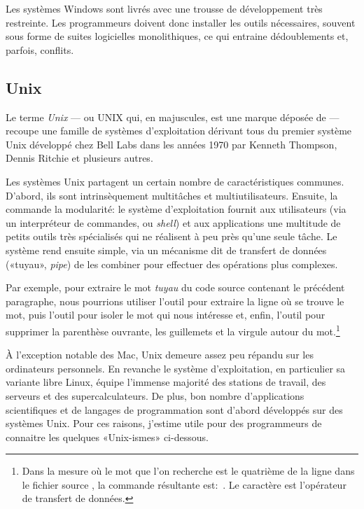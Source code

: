 Les systèmes Windows sont livrés avec une trousse de développement
très restreinte. Les programmeurs doivent donc installer les outils
nécessaires, souvent sous forme de suites logicielles monolithiques,
ce qui entraine dédoublements et, parfois, conflits.

\subsection{Unix}
\label{sec:informatique:os:unix}

Le terme \emph{Unix} --- ou UNIX qui, en majuscules, est
une marque déposée de 
--- recoupe une famille de systèmes d'exploitation dérivant tous du
premier système Unix développé chez Bell Labs dans les années 1970 par
Kenneth Thompson, Dennis Ritchie et plusieurs autres.

Les systèmes Unix partagent un certain nombre de caractéristiques
communes. D'abord, ils sont intrinsèquement multitâches et
multiutilisateurs. Ensuite, la
 commande la modularité: le système d'exploitation fournit aux
utilisateurs (via un interpréteur de commandes, ou \emph{shell}) et
aux applications une multitude de petits outils très spécialisés qui
ne réalisent à peu près qu'une seule tâche. Le système rend ensuite
simple, via un mécanisme dit de transfert de données («tuyau»,
\emph{pipe}) de les combiner pour effectuer des opérations plus
complexes.

Par exemple, pour extraire le mot \emph{tuyau} du code source
contenant le précédent paragraphe, nous pourrions utiliser l'outil
 pour extraire la ligne où se trouve le mot, puis l'outil
 pour isoler le mot qui nous intéresse et, enfin, l'outil
 pour supprimer la parenthèse ouvrante, les guillemets et la
virgule autour du mot.\footnote{%
  Dans la mesure où le mot que l'on recherche est le quatrième de la
  ligne dans le fichier source , la commande
  résultante est: \,. Le caractère \code{|} est l'opérateur de
  transfert de données.}

À l'exception notable des Mac, Unix demeure assez peu
répandu sur les ordinateurs personnels. En revanche le système
d'exploitation, en particulier sa variante libre Linux, équipe
l'immense majorité des stations de travail, des serveurs et des
supercalculateurs. De plus, bon nombre d'applications scientifiques et
de langages de programmation sont d'abord développés sur des systèmes
Unix. Pour ces raisons, j'estime utile pour des programmeurs de
connaitre les quelques «Unix-ismes» ci-dessous.

